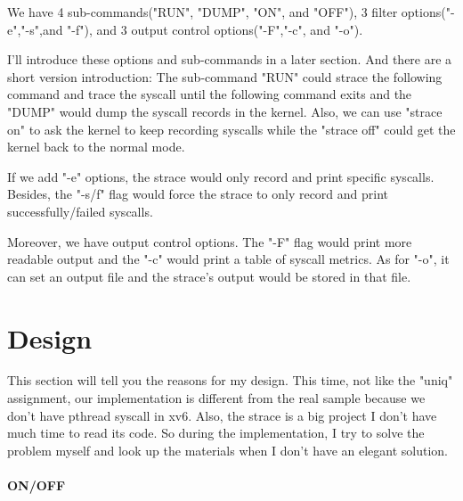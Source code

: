 \documentclass[11pt,oneside,a4paper]{article}
\begin{document}
We have 4 sub-commands("RUN", "DUMP", "ON", and "OFF"), 3 filter options("-e","-s",and "-f"),
and 3 output control options("-F","-c", and "-o").

I'll introduce these options and sub-commands in a later section. And there are a short 
version introduction: The sub-command "RUN" could strace the following command and 
trace the syscall until the following command exits and the "DUMP" would dump the 
syscall records in the kernel. Also, we can use "strace on" to ask the kernel to keep
recording syscalls while the "strace off" could get the kernel back to the normal mode.

If we add "-e" options, the strace would only record and print specific syscalls. 
Besides, the "-s/f" flag would force the strace to only record and print successfully/failed
syscalls. 

Moreover, we have output control options. The "-F" flag would print more readable 
output and the "-c" would print a table of syscall metrics. As for "-o", it can set 
an output file and the strace's output would be stored in that file.

\section{Design}

This section will tell you the reasons for my design. 
This time, not like the "uniq" assignment, our implementation is different 
from the real sample because we don't have pthread syscall in xv6. Also, the 
strace is a big project I don't have much time to read its code. So during the 
implementation, I try to solve the problem myself and look up the materials when 
I don't have an elegant solution.

\paragraph*{ON/OFF}
\end{document}
